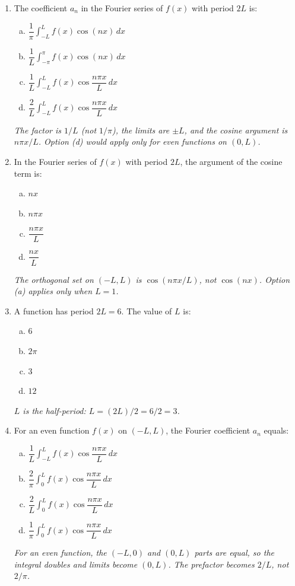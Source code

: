 \documentclass[12pt,a4paper]{article}
\begin{document}
\begin{enumerate}[leftmargin=*]

\item The coefficient $a_n$ in the Fourier series of $f(x)$ with period $2L$ is:
\begin{enumerate}[(a)]
  \item $\dfrac{1}{\pi}\displaystyle\int_{-L}^{L}f(x)\cos(nx)\,dx$
  \item $\dfrac{1}{L}\displaystyle\int_{-\pi}^{\pi}f(x)\cos(nx)\,dx$
  \item \textbf{$\dfrac{1}{L}\displaystyle\int_{-L}^{L}f(x)\cos\dfrac{n\pi x}{L}\,dx$}
  \item $\dfrac{2}{L}\displaystyle\int_{-L}^{L}f(x)\cos\dfrac{n\pi x}{L}\,dx$
\end{enumerate}
\textit{The factor is $1/L$ (not $1/\pi$), the limits are $\pm L$, and the cosine argument is $n\pi x/L$. Option (d) would apply only for even functions on $(0,L)$.}

\medskip
\item In the Fourier series of $f(x)$ with period $2L$, the argument of the cosine term is:
\begin{enumerate}[(a)]
  \item $nx$
  \item $n\pi x$
  \item \textbf{$\dfrac{n\pi x}{L}$}
  \item $\dfrac{nx}{L}$
\end{enumerate}
\textit{The orthogonal set on $(-L,L)$ is $\cos(n\pi x/L)$, not $\cos(nx)$. Option (a) applies only when $L=1$.}

\medskip
\item A function has period $2L = 6$. The value of $L$ is:
\begin{enumerate}[(a)]
  \item $6$
  \item $2\pi$
  \item \textbf{$3$}
  \item $12$
\end{enumerate}
\textit{$L$ is the half-period: $L = (2L)/2 = 6/2 = 3$.}

\medskip
\item For an even function $f(x)$ on $(-L,L)$, the Fourier coefficient $a_n$ equals:
\begin{enumerate}[(a)]
  \item $\dfrac{1}{L}\displaystyle\int_{-L}^{L}f(x)\cos\dfrac{n\pi x}{L}\,dx$
  \item $\dfrac{2}{\pi}\displaystyle\int_{0}^{L}f(x)\cos\dfrac{n\pi x}{L}\,dx$
  \item \textbf{$\dfrac{2}{L}\displaystyle\int_{0}^{L}f(x)\cos\dfrac{n\pi x}{L}\,dx$}
  \item $\dfrac{1}{\pi}\displaystyle\int_{0}^{L}f(x)\cos\dfrac{n\pi x}{L}\,dx$
\end{enumerate}
\textit{For an even function, the $(-L,0)$ and $(0,L)$ parts are equal, so the integral doubles and limits become $(0,L)$.  The prefactor becomes $2/L$, not $2/\pi$.}


\end{enumerate}
\end{document}
